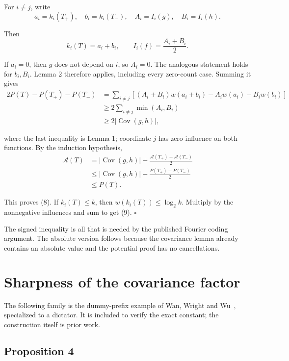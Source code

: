 \documentclass[
  american,
  11pt,
]{article}
\begin{document}
For \(i\ne j\), write \[
a_i=k_i(T_+),\quad b_i=k_i(T_-),\quad
A_i=I_i(g),\quad B_i=I_i(h).
\]

Then \[
k_i(T)=a_i+b_i,\qquad
I_i(f)=\frac{A_i+B_i}{2}.
\tag{10}
\]

If \(a_i=0\), then \(g\) does not depend on \(i\), so \(A_i=0\). The
analogous statement holds for \(b_i,B_i\). Lemma 2 therefore applies,
including every zero-count case. Summing it gives \[
\begin{aligned}
2P(T)-P(T_+)-P(T_-)
&=\sum_{i\ne j}\left[(A_i+B_i)w(a_i+b_i)-A_iw(a_i)-B_iw(b_i)\right]\\
&\geq2\sum_{i\ne j}\min(A_i,B_i)\\
&\geq2|\operatorname{Cov}(g,h)|,
\end{aligned}
\tag{11}
\]

where the last inequality is Lemma 1; coordinate \(j\) has zero
influence on both functions. By the induction hypothesis, \[
\begin{aligned}
\mathcal A(T)
&=|\operatorname{Cov}(g,h)|+\frac{\mathcal A(T_+)+\mathcal A(T_-)}2\\
&\leq|\operatorname{Cov}(g,h)|+\frac{P(T_+)+P(T_-)}2\\
&\leq P(T).
\end{aligned}
\]

This proves (8). If \(k_i(T)\leq k\), then \(w(k_i(T))\leq\log_2k\).
Multiply by the nonnegative influences and sum to get (9). \(\square\)

The signed inequality is all that is needed by the published Fourier
coding argument. The absolute version follows because the covariance
lemma already contains an absolute value and the potential proof has no
cancellations.

\section{Sharpness of the covariance
factor}\label{sharpness-of-the-covariance-factor}

The following family is the dummy-prefix example of Wan, Wright and
Wu~\cite[Section~2.4]{WWW}, specialized to a dictator. It is included to verify the
exact constant; the construction itself is prior work.

\subsection*{Proposition 4}\label{proposition-4}
\end{document}
